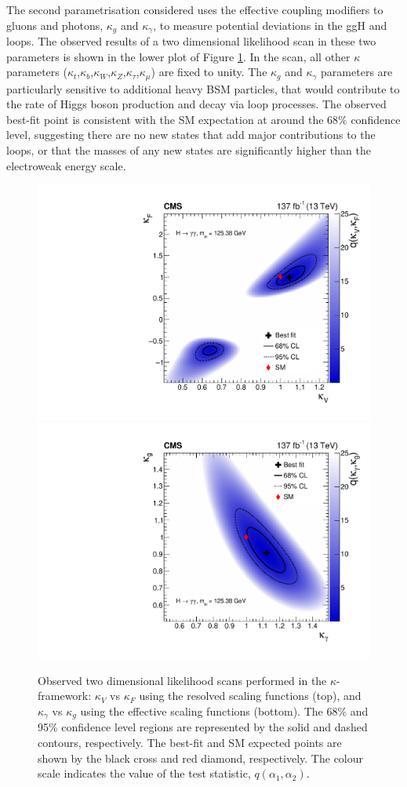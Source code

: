 The second parametrisation considered uses the effective coupling modifiers to gluons and photons, $\kappa_g$ and $\kappa_\gamma$, to measure potential deviations in the ggH and \Hgg loops. The observed results of a two dimensional likelihood scan in these two parameters is shown in the lower plot of Figure \ref{fig:2d_kappa}. In the scan, all other $\kappa$ parameters ($\kappa_t$,$\kappa_b$,$\kappa_W$,$\kappa_Z$,$\kappa_\tau$,$\kappa_\mu$) are fixed to unity. The $\kappa_g$ and $\kappa_\gamma$ parameters are particularly sensitive to additional heavy BSM particles, that would contribute to the rate of Higgs boson production and decay via loop processes. The observed best-fit point is consistent with the SM expectation at around the 68\% confidence level, suggesting there are no new states that add major contributions to the loops, or that the masses of any new states are significantly higher than the electroweak energy scale.

\begin{figure}[htb!]
  \centering
  \includegraphics[width=.65\textwidth]{Figures/hgg_results/scan2D_kappa_V_vs_kappa_F_obs.pdf}
  \includegraphics[width=.65\textwidth]{Figures/hgg_results/scan2D_kappa_gam_vs_kappa_g_obs.pdf}
  \caption[Two dimensional likelihood scans in the coupling modifier parametrisation]
  {
    Observed two dimensional likelihood scans performed in the $\kappa$-framework: $\kappa_V$ vs $\kappa_F$ using the resolved scaling functions (top), and $\kappa_\gamma$ vs $\kappa_g$ using the effective scaling functions (bottom). The 68\% and 95\% confidence level regions are represented by the solid and dashed contours, respectively. The best-fit and SM expected points are shown by the black cross and red diamond, respectively. The colour scale indicates the value of the test statistic, $q(\alpha_1,\alpha_2)$.
  }
  \label{fig:2d_kappa}
\end{figure}


